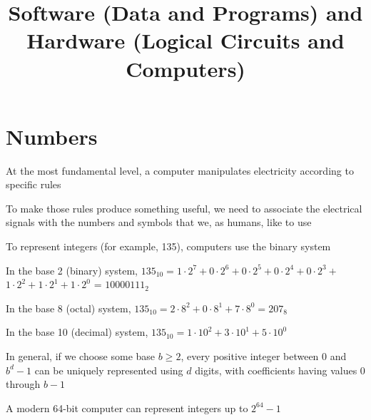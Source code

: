 \documentclass[8pt,a4paper,compress]{beamer}
\title{Software (Data and Programs) and Hardware (Logical Circuits and Computers)}
\date{}
\begin{document}
\begin{frame}
\vfill
\titlepage
\end{frame}

\section{Numbers}
\begin{frame}[fragile]
\pause

At the most fundamental level, a computer manipulates electricity according to specific rules

\pause
\bigskip

To make those rules produce something useful, we need to associate the electrical signals with the numbers and symbols that we, as humans, like to use

\pause
\bigskip

To represent integers (for example, 135), computers use the binary system

\pause
\bigskip

In the base 2 (binary) system, $135_{10} = 1 \cdot 2^7 + 0 \cdot 2^6 + 0 \cdot 2^5 + 0 \cdot 2^4 + 0 \cdot 2^3 + $ $1 \cdot 2^2 + 1 \cdot 2^1 + 1 \cdot 2^0$ = $10000111_{2}$

\pause
\bigskip

In the base 8 (octal) system, $135_{10} = 2 \cdot 8^2 + 0 \cdot 8^1 + 7 \cdot 8^0 = 207_{8}$

\pause
\bigskip

In the base 10 (decimal) system, $135_{10} = 1 \cdot 10^2 + 3 \cdot 10^1 + 5 \cdot 10^0$

\pause
\bigskip

In general, if we choose some base $b \geq 2$, every positive integer between 0 and $b^d-1$ can be uniquely represented using $d$ digits, with coefficients having values 0 through $b-1$

\pause
\bigskip

A modern 64-bit computer can represent integers up to $2^{64} - 1$
\end{frame}
\end{document}
